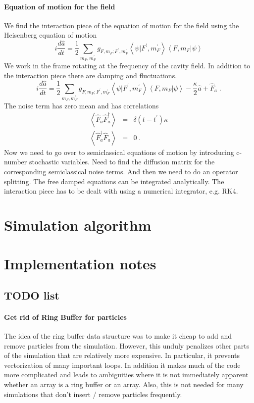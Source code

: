 \documentclass[aps, superscriptaddress, groupedaddress, preprint]{revtex4}
\begin{document}
\paragraph{Equation of motion for the field} We find the
interaction piece of the equation of motion for the field using
the Heisenberg equation of motion
\begin{equation}
i\frac{d\hat a}{dt}=
\frac{1}{2}\sum_{m_F,m_F^\prime}
g_{F, m_F;F^\prime, m_F^\prime}
\left<\psi|F^\prime, m_F^\prime\right>
\left<F, m_F|\psi\right>
\end{equation}
We work in the frame rotating at the frequency of the cavity
field.  In addition to the interaction piece there are damping
and fluctuations.
\begin{equation}
i\frac{d\hat a}{dt}=
\frac{1}{2}\sum_{m_F,m_F^\prime}
g_{F, m_F;F^\prime, m_F^\prime}
\left<\psi|F^\prime, m_F^\prime\right>
\left<F, m_F|\psi\right>
-\frac{\kappa}{2}\hat a + \hat F_a\;.
\end{equation}
The noise term has zero mean and has correlations
\begin{eqnarray}
\left<\hat F_a\hat F_a^\dagger\right>&=&\delta(t-t^\prime)\kappa\\
\left<\hat F_a^\dagger\hat F_a\right>&=&0\;.
\end{eqnarray}
Now we need to go over to semiclassical equations of motion by
introducing c-number stochastic variables.  Need to find the
diffusion matrix for the corresponding semiclassical noise terms.
And then we need to do an operator splitting.  The free damped
equations can be integrated analytically.  The interaction piece
has to be dealt with using a numerical integrator, e.g. RK4.



\section{Simulation algorithm}

\section{Implementation notes}

\subsection{TODO list}

\paragraph{Get rid of Ring Buffer for particles} The idea of the
ring buffer data structure was to make it cheap to add and remove
particles from the simulation.  However, this unduly penalizes
other parts of the simulation that are relatively more expensive.
In particular, it prevents vectorization of many important loops.
In addition it makes much of the code more complicated and leads
to ambiguities where it is not immediately apparent whether an
array is a ring buffer or an array.  Also, this is not needed for
many simulations that don't insert / remove particles frequently.
\end{document}
